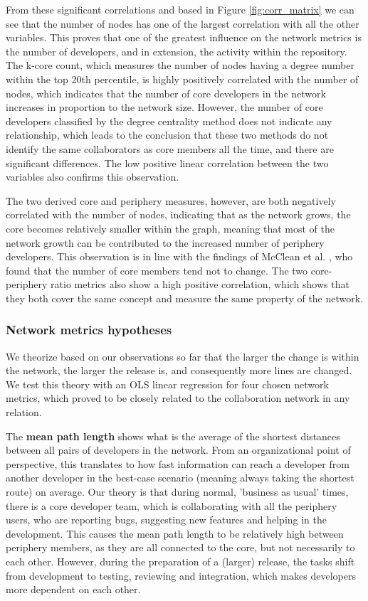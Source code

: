 From these significant correlations and based in Figure \ref{fig:corr_matrix} we can see that the number of nodes has one of the largest correlation with all the other variables. This proves that one of the greatest influence on the network metrics is the number of developers, and in extension, the activity within the repository. The k-core count, which measures the number of nodes having a degree number within the top 20th percentile, is highly positively correlated with the number of nodes, which indicates that the number of core developers in the network increases in proportion to the network size. However, the number of core developers classified by the degree centrality method does not indicate any relationship, which leads to the conclusion that these two methods do not identify the same collaborators as core members all the time, and there are significant differences. The low positive linear correlation between the two variables also confirms this observation.

The two derived core and periphery measures, however, are both negatively correlated with the number of nodes, indicating that as the network grows, the core becomes relatively smaller within the graph, meaning that most of the network growth can be contributed to the increased number of periphery developers. This observation is in line with the findings of McClean et al. \cite{mccleanSocialNetworkAnalysis2021}, who found that the number of core members tend not to change. The two core-periphery ratio metrics also show a high positive correlation, which shows that they both cover the same concept and measure the same property of the network.

\subsubsection{Network metrics hypotheses}

We theorize based on our observations so far that the larger the change is within the network, the larger the release is, and consequently more lines are changed. We test this theory with an OLS linear regression for four chosen network metrics, which proved to be closely related to the collaboration network in any relation.

The \textbf{mean path length} shows what is the average of the shortest distances between all pairs of developers in the network. From an organizational point of perspective, this translates to how fast information can reach a developer from another developer in the best-case scenario (meaning always taking the shortest route) on average. Our theory is that during normal, 'business as usual' times, there is a core developer team, which is collaborating with all the periphery users, who are reporting bugs, suggesting new features and helping in the development. This causes the mean path length to be relatively high between periphery members, as they are all connected to the core, but not necessarily to each other. However, during the preparation of a (larger) release, the tasks shift from development to testing, reviewing and integration, which makes developers more dependent on each other. 

